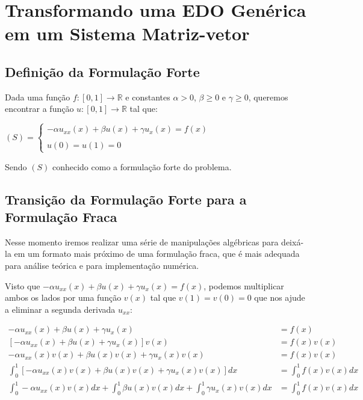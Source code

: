 
\chapter{Transformando uma EDO Genérica em um Sistema Matriz-vetor}
\section{Definição da Formulação Forte}

  Dada uma função $f : [0,1] \to \mathbb{R}$ e constantes $\alpha > 0$, $\beta \geq 0$ e $\gamma \geq 0$, queremos encontrar a função $u : [0,1] \to \mathbb{R}$ tal que:

  \begin{center}
    $(S) = \begin{cases}
      -\alpha u_{xx}(x) + \beta u(x) + \gamma u_{x}(x) = f(x) \\
      \\
      u(0) = u(1) = 0
    \end{cases}$
  \end{center}

  Sendo $(S)$ conhecido como a formulação forte do problema.

\section{Transição da Formulação Forte para a Formulação Fraca}

Nesse momento iremos realizar uma série de manipulações algébricas para deixá-la em um formato mais próximo de uma formulação fraca, que é mais adequada para análise teórica e para implementação numérica.

Visto que $-\alpha u_{xx}(x) + \beta u(x) + \gamma u_{x}(x) = f(x)$, podemos multiplicar ambos os lados por uma função $v(x)$ tal que $v(1) = v(0) = 0$ que nos ajude a eliminar a segunda derivada $u_{xx}$:

\begin{align*}
  -\alpha u_{xx}(x) + \beta u(x) + \gamma u_{x}(x) &= f(x)  \\
  \left[-\alpha u_{xx}(x) + \beta u(x) + \gamma u_{x}(x)\right]v(x) &= f(x)v(x) \\
  -\alpha u_{xx}(x)v(x) + \beta u(x)v(x) + \gamma u_{x}(x)v(x) &= f(x)v(x)\\
  \int^{1}_{0} \left[-\alpha u_{xx}(x)v(x) + \beta u(x)v(x) + \gamma u_{x}(x)v(x)\right] dx &= \int^{1}_{0} f(x)v(x) dx\\
  \int^{1}_{0} -\alpha u_{xx}(x)v(x) dx + \int^{1}_{0} \beta u(x)v(x) dx + \int^{1}_{0} \gamma u_{x}(x)v(x) dx &= \int^{1}_{0} f(x)v(x) dx
\end{align*}

